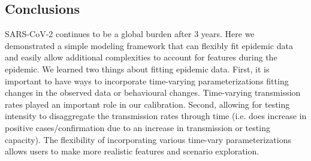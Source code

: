 \documentclass[12pt]{article}\usepackage[]{graphicx}\usepackage[]{color}
\begin{document}
\subsection{Conclusions}


SARS-CoV-2 continues to be a global burden after 3 years. 
Here we demonstrated a simple modeling framework that can flexibly fit epidemic data and easily allow additional complexities to account for features during the epidemic. 
We learned two things about fitting epidemic data. 
First, it is important to have ways to incorporate time-varying parameterizations fitting changes in the observed data or behavioural changes. Time-varying transmission rates played an important role in our calibration. 
Second, allowing for testing intensity to disaggregate the transmission rates through time (i.e. does increase in positive cases/confirmation due to an increase in transmission or testing capacity). 
The flexibility of incorporating various time-vary parameterizations allows users to make more realistic features and scenario exploration. 


\thickredline
\clearpage



\end{document}
